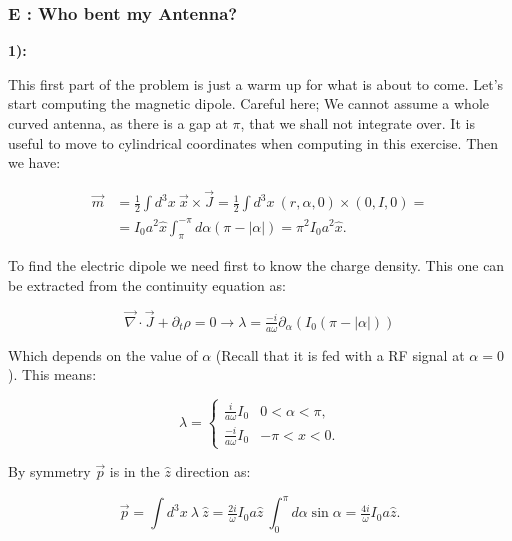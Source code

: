 \subsubsection{E : Who bent my Antenna?}\label{E : Who bent my Antenna?}

\textbf{1):}

This first part of the problem is just a warm up for what is about to come. Let's start computing the magnetic dipole. Careful here; We cannot assume a whole curved antenna, as there is a gap at $\pi$, that we shall not integrate over.  It is useful to move to cylindrical coordinates when computing in this exercise. Then we have:

\begin{equation}
	\begin{split}
		\vec{m} &= \tfrac{1}{2}\int d^{3}x \:\vec{x} \times \vec{J} = \tfrac{1}{2}\int d^{3}x \:( r, \alpha, 0) \times (0, I,0 ) =\\
		&= I_{0} a^{2} \hat{x} \int_{\pi}^{-\pi} d\alpha (\pi - |\alpha|) = \pi^{2} I_{0} a^{2} \hat{x}. 
	\end{split}
\end{equation}

To find the electric dipole we need first to know the charge density. This one can be extracted from the continuity equation as:

\begin{equation}
	\vec{\nabla}\cdot \vec{J} + \partial_{t} \rho =0 \rightarrow \lambda = \tfrac{-i}{a \omega} \partial_{\alpha} (I_{0}(\pi - |\alpha|))
\end{equation}

Which depends on the value of $\alpha$ (Recall that it is fed with a RF signal at $\alpha =0$). This means:

\begin{equation}
	\lambda  = \left\{\begin{array}{ll}
		\frac{i}{a \omega} I_{0} & 0 < \alpha < \pi, \\
		\frac{-i}{a \omega} I_{0} & -\pi<x <0.
	\end{array}\right.
\end{equation}

By symmetry $\vec{p}$ is in the $\hat{z}$ direction as:

\begin{equation}
	\vec{p} = \int d^{3}x \: \lambda \: \hat{z} = \tfrac{2i}{\omega} I_{0} a \hat{z} \: \int_{0}^{\pi} d\alpha \sin \alpha = \tfrac{4i}{\omega} I_{0} a \hat{z}.
\end{equation}

